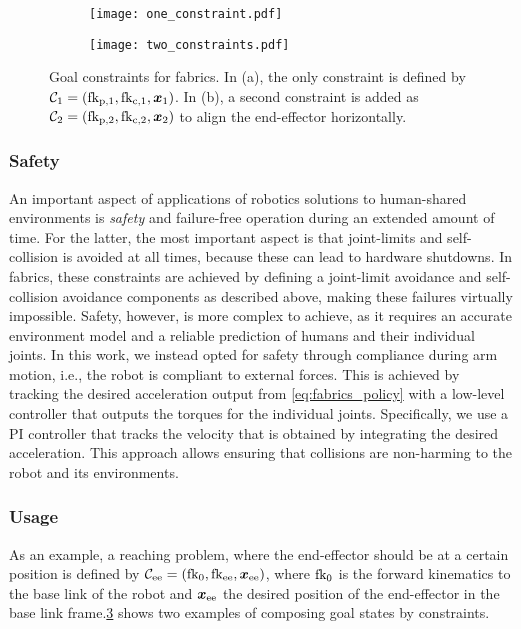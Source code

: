 \begin{figure}[b]
  \centering
  \begin{subfigure}[b]{0.5\linewidth}
    \centering
    \texttt{[image: one\_constraint.pdf]}
    \caption{}
    \label{subfig:one_goal_constraint}
  \end{subfigure}%
  \begin{subfigure}[b]{0.5\linewidth}
    \centering
    \texttt{[image: two\_constraints.pdf]}
    \caption{}
    \label{subfig:two_goal_constraints}
  \end{subfigure}
  \caption{Goal constraints for \ac{fabrics}. In (a), 
  the only constraint is defined by $\mathcal{C}_1 = (\textrm{fk}_{\textrm{p,1}},
  \textrm{fk}_{\textrm{c,1}}, \bm{x}_1)$.
  In (b), a second constraint is added as
   $\mathcal{C}_2 = (\textrm{fk}_{\textrm{p,2}}, \textrm{fk}_{\textrm{c,2}}, \bm{x}_2)$ to align the
   end-effector horizontally.}
  \label{fig:goal_constraints}
\end{figure}

\subsubsection{Safety}
\label{ssub:safety}

An important aspect of applications of robotics solutions to
human-shared environments is \textit{safety} and
failure-free operation during an extended amount of time.
For the latter, the most important aspect is that
joint-limits and self-collision is avoided at all times,
because these can lead to hardware shutdowns.
In \ac{fabrics}, these constraints are achieved by defining a joint-limit
avoidance and self-collision avoidance components as
described above, making these failures virtually impossible.
Safety, however, is more complex to achieve, as it requires an
accurate environment model and a reliable prediction of
humans and their individual joints. In this work, we instead
opted for safety through compliance during arm motion, i.e.,
the robot is compliant to external forces. This is achieved
by tracking the desired acceleration output from
\cref{eq:fabrics_policy} with a low-level controller that
outputs the torques for the individual joints.
Specifically, we use a
PI controller that tracks the velocity that is obtained by
integrating the desired acceleration. This approach allows
ensuring that collisions are non-harming to the robot and its
environments. 

\subsubsection{Usage} As an example, a reaching problem, where the
end-effector should be at a certain position is defined by
$\mathcal{C}_{\textrm{ee}} = (\textrm{fk}_{\textrm{0}},\textrm{fk}_{\textrm{ee}},\bm{x}_\textrm{ee})$,
where $\textrm{fk}_{\textrm{0}}$ is the forward kinematics to the base link of
the robot and $\bm{x}_\textrm{ee}$ the desired position of the
end-effector in the base link frame.\cref{fig:goal_constraints} shows two examples of composing goal states by constraints.

